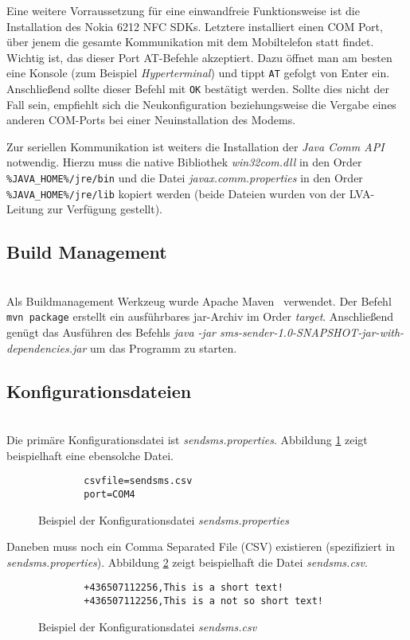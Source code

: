 \documentclass[paper=a4, fontsize=11pt]{scrartcl}
\begin{document}
Eine weitere Vorraussetzung für eine einwandfreie
Funktionsweise ist die Installation des Nokia 6212 NFC SDKs. Letztere installiert einen COM Port, über jenem die gesamte
Kommunikation mit dem Mobiltelefon statt findet. Wichtig ist, das dieser Port AT-Befehle akzeptiert. 
Dazu öffnet man am besten eine Konsole (zum Beispiel \textit{Hyperterminal}) und tippt \texttt{AT} gefolgt von Enter ein. 
Anschließend sollte dieser Befehl mit \texttt{OK} bestätigt werden. Sollte dies nicht der Fall sein, empfiehlt sich 
die Neukonfiguration beziehungsweise die Vergabe eines anderen COM-Ports bei einer Neuinstallation des Modems.

Zur seriellen Kommunikation ist weiters die Installation der \textit{Java Comm API} notwendig. Hierzu muss die native Bibliothek \textit{win32com.dll} in den Order \texttt{\%JAVA\_HOME\%/jre/bin} und die Datei \textit{javax.comm.properties} in den Order \texttt{\%JAVA\_HOME\%/jre/lib} kopiert werden (beide Dateien wurden von der LVA-Leitung zur Verfügung gestellt).

\subsection{Build Management}~\\
Als Buildmanagement Werkzeug wurde Apache Maven~\cite{maven} verwendet. Der Befehl \texttt{mvn package} erstellt ein
ausführbares jar-Archiv im Order \textit{target}. Anschließend genügt  das Ausführen des Befehls \textit{java -jar sms-sender-1.0-SNAPSHOT-jar-with-dependencies.jar}
um das Programm zu starten. 

\subsection{Konfigurationsdateien}~\\
Die primäre Konfigurationsdatei ist \textit{sendsms.properties}.
Abbildung \ref{fig:sms-prop} zeigt beispielhaft eine ebensolche Datei.\\ 

\begin{figure}[H]
	\begin{verbatim}
		csvfile=sendsms.csv
		port=COM4
	\end{verbatim}
	\caption{Beispiel der Konfigurationsdatei \textit{sendsms.properties}}
	\label{fig:sms-prop}
\end{figure}

Daneben muss noch ein Comma Separated File (CSV) existieren (spezifiziert in \textit{sendsms.properties}). 
Abbildung \ref{fig:sms-csv} zeigt beispielhaft die Datei \textit{sendsms.csv}.\\
 \begin{figure}[H]
 	\begin{verbatim}
		+436507112256,This is a short text!
		+436507112256,This is a not so short text!
 	\end{verbatim}
 	\caption{Beispiel der Konfigurationsdatei \textit{sendsms.csv}}
 	\label{fig:sms-csv}
 \end{figure}
 
\end{document}
